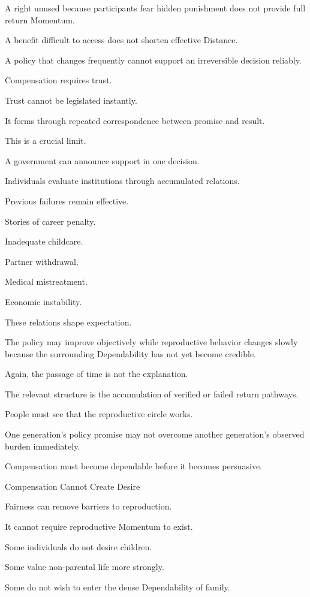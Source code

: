 A right unused because participants fear hidden punishment does not provide full return Momentum.

A benefit difficult to access does not shorten effective Distance.

A policy that changes frequently cannot support an irreversible decision reliably.

Compensation requires trust.

Trust cannot be legislated instantly.

It forms through repeated correspondence between promise and result.

This is a crucial limit.

A government can announce support in one decision.

Individuals evaluate institutions through accumulated relations.

Previous failures remain effective.

Stories of career penalty.

Inadequate childcare.

Partner withdrawal.

Medical mistreatment.

Economic instability.

These relations shape expectation.

The policy may improve objectively while reproductive behavior changes slowly because the surrounding Dependability has not yet become credible.

Again, the passage of time is not the explanation.

The relevant structure is the accumulation of verified or failed return pathways.

People must see that the reproductive circle works.

One generation’s policy promise may not overcome another generation’s observed burden immediately.

Compensation must become dependable before it becomes persuasive.

Compensation Cannot Create Desire

Fairness can remove barriers to reproduction.

It cannot require reproductive Momentum to exist.

Some individuals do not desire children.

Some value non-parental life more strongly.

Some do not wish to enter the dense Dependability of family.

